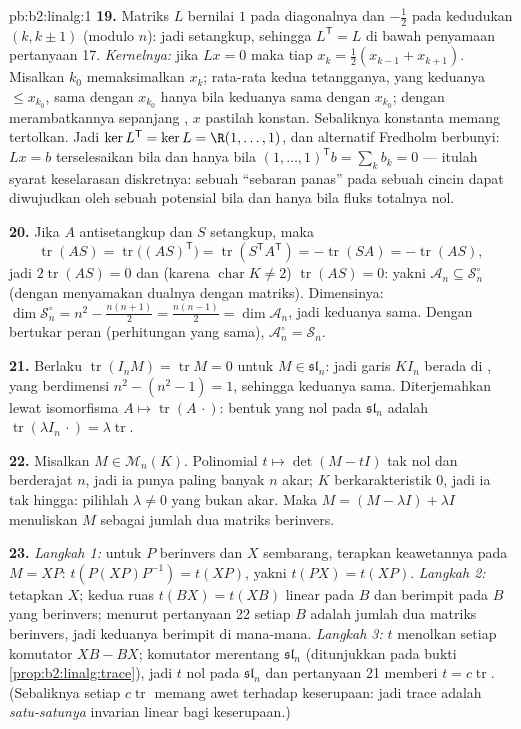 \begin{solution}{pb:b2:linalg:1}
\textbf{19.} Matriks $L$ bernilai $1$ pada diagonalnya dan
$-\frac12$ pada kedudukan $(k, k\pm1)$ (modulo $n$): jadi setangkup,
sehingga $L^{\mathsf T} = L$ di bawah penyamaan pertanyaan 17.
\emph{Kernelnya:} jika $Lx = 0$ maka tiap $x_k = \frac12(x_{k-1} +
x_{k+1})$. Misalkan $k_0$ memaksimalkan $x_k$; rata-rata kedua
tetangganya, yang keduanya $\leq x_{k_0}$, sama dengan $x_{k_0}$ hanya
bila keduanya sama dengan $x_{k_0}$; dengan merambatkannya sepanjang
, $x$ pastilah konstan. Sebaliknya konstanta memang tertolkan.
Jadi $\ker L^{\mathsf T} = \ker L = \R(1, \dots, 1)$, dan alternatif
Fredholm berbunyi: $Lx = b$ terselesaikan bila dan hanya bila
$(1,\dots,1)^{\mathsf T} b = \sum_k b_k = 0$ --- itulah syarat
keselarasan diskretnya: sebuah ``sebaran panas'' pada sebuah cincin
dapat diwujudkan oleh sebuah potensial bila dan hanya bila fluks
totalnya nol.

\textbf{20.} Jika $A$ antisetangkup dan $S$ setangkup, maka
\[
\operatorname{tr}(AS) = \operatorname{tr}\bigl((AS)^{\mathsf
T}\bigr) = \operatorname{tr}(S^{\mathsf T}A^{\mathsf T}) =
-\operatorname{tr}(SA) = -\operatorname{tr}(AS),
\]
jadi $2\operatorname{tr}(AS) = 0$ dan (karena $\operatorname{char} K \neq
2$) $\operatorname{tr}(AS) = 0$: yakni $\mathcal{A}_n \subseteq
\mathcal{S}_n^\circ$ (dengan menyamakan dualnya dengan matriks).
Dimensinya: $\dim\mathcal{S}_n^\circ = n^2 - \frac{n(n+1)}2 =
\frac{n(n-1)}2 = \dim\mathcal{A}_n$, jadi keduanya sama. Dengan
bertukar peran (perhitungan yang sama), $\mathcal{A}_n^\circ = \mathcal{S}_n$.

\textbf{21.} Berlaku $\operatorname{tr}(I_nM) = \operatorname{tr} M = 0$
untuk $M \in \mathfrak{sl}_n$: jadi garis $KI_n$ berada di
, yang berdimensi $n^2 - (n^2 - 1) = 1$, sehingga keduanya
sama. Diterjemahkan lewat isomorfisma $A \mapsto
\operatorname{tr}(A\,\cdot)$: bentuk yang nol pada
$\mathfrak{sl}_n$ adalah $\operatorname{tr}(\lambda I_n\,\cdot) =
\lambda\operatorname{tr}$.

\textbf{22.} Misalkan $M \in \mathcal{M}_n(K)$. Polinomial $t
\mapsto \det(M - tI)$ tak nol dan berderajat $n$, jadi ia punya paling
banyak $n$ akar; $K$ berkarakteristik $0$, jadi ia tak hingga: pilihlah
$\lambda \neq 0$ yang bukan akar. Maka $M = (M - \lambda I) +
\lambda I$ menuliskan $M$ sebagai jumlah dua matriks berinvers.

\textbf{23.} \emph{Langkah 1:} untuk $P$ berinvers dan $X$
sembarang, terapkan keawetannya pada $M = XP$: $t(P(XP)P^{-1}) = t(XP)$,
yakni $t(PX) = t(XP)$. \emph{Langkah 2:} tetapkan $X$; kedua ruas
$t(BX) = t(XB)$ linear pada $B$ dan berimpit pada $B$ yang berinvers;
menurut pertanyaan 22 setiap $B$ adalah jumlah dua matriks berinvers,
jadi keduanya berimpit di mana-mana. \emph{Langkah 3:} $t$ menolkan
setiap komutator $XB - BX$; komutator merentang $\mathfrak{sl}_n$
(ditunjukkan pada bukti \cref{prop:b2:linalg:trace}), jadi $t$ nol pada
$\mathfrak{sl}_n$ dan pertanyaan 21 memberi $t =
c\operatorname{tr}$. (Sebaliknya setiap $c\operatorname{tr}$ memang awet
terhadap keserupaan: jadi trace adalah \emph{satu-satunya} invarian
linear bagi keserupaan.)


\end{solution}
